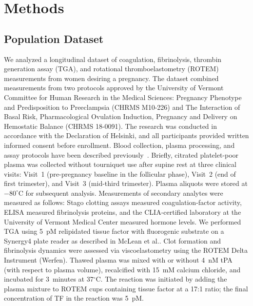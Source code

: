 \section{Methods}
\label{sec:methods}

\subsection{Population Dataset}
\label{sec:dataset}
We analyzed a longitudinal dataset of coagulation, fibrinolysis, thrombin generation
assay (TGA), and rotational thromboelastometry (ROTEM) measurements from women
desiring a pregnancy. The dataset combined measurements from two protocols approved by the
University of Vermont Committee for Human Research in the Medical Sciences: Pregnancy
Phenotype and Predisposition to Preeclampsia (CHRMS M10-226) and The Interaction of Basal
Risk, Pharmacological Ovulation Induction, Pregnancy and Delivery on Hemostatic Balance
(CHRMS 18-0091). The research was conducted in accordance with the Declaration of Helsinki,
and all participants provided written informed consent before enrollment.
Blood collection, plasma processing, and assay protocols have been described
previously~\citep{McLean2012TGA,Hale2012}. Briefly, citrated platelet-poor plasma
was collected without tourniquet use after supine rest at three clinical visits:
Visit~1 (pre-pregnancy baseline in the follicular phase), Visit~2 (end of first
trimester), and Visit~3 (mid-third trimester). Plasma aliquots were stored at
$-80^{\circ}$C for subsequent analysis. Measurements of secondary analytes were
measured as follows: Stago clotting assays measured coagulation-factor activity, ELISA
measured fibrinolysis proteins, and the CLIA-certified laboratory at the University of Vermont
Medical Center measured hormone levels. We performed TGA using 5~pM relipidated tissue factor with
fluorogenic substrate on a Synergy4 plate reader as described
in McLean et al.\citep{McLean2012TGA}. Clot formation and fibrinolysis dynamics were assessed via
viscoelastometry using the ROTEM Delta Instrument (Werfen). Thawed plasma was mixed
with or without 4~nM tPA (with respect to plasma volume), recalcified with 15~mM
calcium chloride, and incubated for 3~minutes at 37$^{\circ}$C. The reaction was
initiated by adding the plasma mixture to ROTEM cups containing tissue factor at a
17:1 ratio; the final concentration of TF in the reaction was 5~pM.

